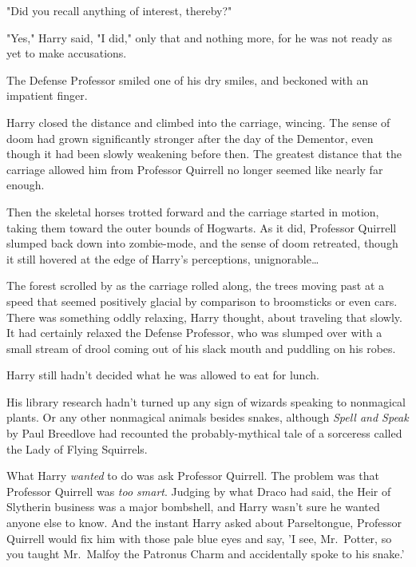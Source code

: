 "Did you recall anything of interest, thereby?"

"Yes," Harry said, "I did," only that and nothing more, for he was not ready as 
yet to make accusations.

The Defense Professor smiled one of his dry smiles, and beckoned with an 
impatient finger.

Harry closed the distance and climbed into the carriage, wincing. The sense of 
doom had grown significantly stronger after the day of the Dementor, even 
though it had been slowly weakening before then. The greatest distance that the 
carriage allowed him from Professor Quirrell no longer seemed like nearly far 
enough.

Then the skeletal horses trotted forward and the carriage started in motion, 
taking them toward the outer bounds of Hogwarts. As it did, Professor Quirrell 
slumped back down into zombie-mode, and the sense of doom retreated, though it 
still hovered at the edge of Harry's perceptions, unignorable{\ldots}

The forest scrolled by as the carriage rolled along, the trees moving past at a 
speed that seemed positively glacial by comparison to broomsticks or even cars. 
There was something oddly relaxing, Harry thought, about traveling that slowly. 
It had certainly relaxed the Defense Professor, who was slumped over with a 
small stream of drool coming out of his slack mouth and puddling on his robes.

Harry still hadn't decided what he was allowed to eat for lunch.

His library research hadn't turned up any sign of wizards speaking to 
nonmagical plants. Or any other nonmagical animals besides snakes, although 
\emph{Spell and Speak} by Paul Breedlove had recounted the probably-mythical 
tale of a sorceress called the Lady of Flying Squirrels.

What Harry \emph{wanted} to do was ask Professor Quirrell. The problem was that 
Professor Quirrell was \emph{too smart}. Judging by what Draco had said, the 
Heir of Slytherin business was a major bombshell, and Harry wasn't sure he 
wanted anyone else to know. And the instant Harry asked about Parseltongue, 
Professor Quirrell would fix him with those pale blue eyes and say, 'I see, 
Mr.~Potter, so you taught Mr.~Malfoy the Patronus Charm and accidentally spoke 
to his snake.'

